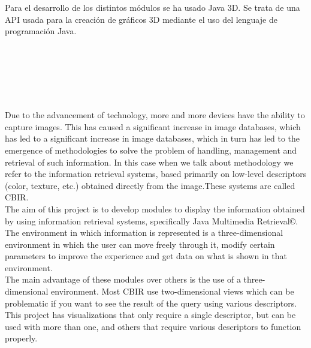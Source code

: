 Para el desarrollo de los distintos módulos se ha usado Java 3D. Se trata de una API usada para la creación de gráficos 3D mediante el uso del lenguaje de programación Java.\\








\newpage


\begin{center}
{\large\bfseries \myEngTitle}\\
\end{center}
\begin{center}
\myName\\
\end{center}

\\

\vspace{0.7cm}
\\

Due to the advancement of technology, more and more devices have the ability to capture images. This has caused a significant increase in image databases, which has led to a significant increase in image databases, which in turn has led to the emergence of methodologies to solve the problem of handling, management and retrieval of such information. In this case when we talk about methodology we refer to the information retrieval systems, based primarily on low-level descriptors (color, texture, etc.) obtained directly from the image.These systems are called CBIR.\\

The aim of this project is to develop modules to display the information obtained by using information retrieval systems, specifically Java Multimedia Retrieval©. The environment in which information is represented is a three-dimensional environment in which the user can move freely through it, modify certain parameters to improve the experience and get data on what is shown in that environment.\\

The main advantage of these modules over others is the use of a three-dimensional environment. Most CBIR use two-dimensional views which can be problematic if you want to see the result of the query using various descriptors. This project has visualizations that only require a single descriptor, but can be used with more than one, and others that require various descriptors to function properly.\\


